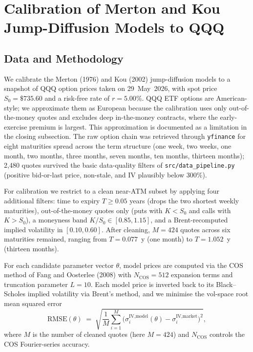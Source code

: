 \section*{Calibration of Merton and Kou Jump-Diffusion Models to QQQ}

\subsection*{Data and Methodology}

We calibrate the Merton (1976) and Kou (2002) jump-diffusion models to a
snapshot of QQQ option prices taken on 29~May~2026, with spot price
$S_0 = \$735.60$ and a risk-free rate of $r = 5.00\%$. QQQ ETF options
are American-style; we approximate them as European because the
calibration uses only out-of-the-money quotes and excludes deep
in-the-money contracts, where the early-exercise premium is largest.
This approximation is documented as a limitation in the closing
subsection. The raw option chain was retrieved through
\texttt{yfinance} for eight maturities spread across the term structure
(one week, two weeks, one month, two months, three months, seven
months, ten months, thirteen months); 2{,}480 quotes survived the
basic data-quality filters of \texttt{src/data\_pipeline.py} (positive
bid-or-last price, non-stale, and IV plausibly below 300\%).

For calibration we restrict to a clean near-ATM subset by applying four
additional filters: time to expiry $T \geq 0.05$ years (drops the two
shortest weekly maturities), out-of-the-money quotes only (puts with
$K < S_0$ and calls with $K > S_0$), a moneyness band $K/S_0 \in
[0.85, 1.15]$, and a Brent-recomputed implied volatility in $[0.10,
0.60]$. After cleaning, $M = 424$ quotes across six maturities
remained, ranging from $T = 0.077$~y (one month) to $T = 1.052$~y
(thirteen months).

For each candidate parameter vector $\theta$, model prices are computed
via the COS method of Fang and Oosterlee (2008) with
$N_{\text{COS}} = 512$ expansion terms and truncation parameter
$L = 10$. Each model price is inverted back to its Black--Scholes
implied volatility via Brent's method, and we minimise the vol-space
root mean squared error
\[
   \text{RMSE}(\theta) \;=\;
   \sqrt{\frac{1}{M}\sum_{i=1}^{M}
            \bigl( \sigma^{\text{IV},\text{model}}_i(\theta)
                   - \sigma^{\text{IV},\text{market}}_i \bigr)^{\!2}},
\]
where $M$ is the number of cleaned quotes (here $M = 424$) and
$N_{\text{COS}}$ controls the COS Fourier-series accuracy.

